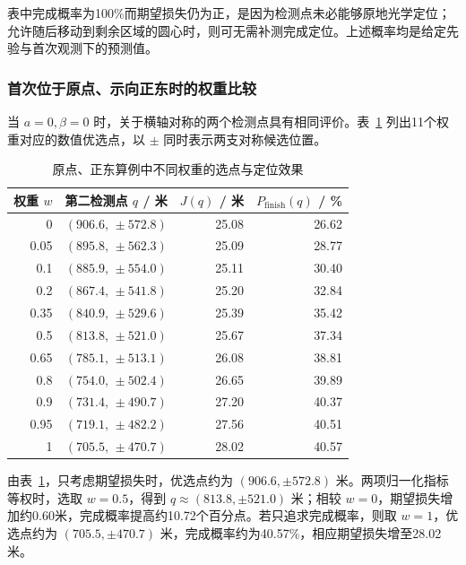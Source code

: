 \documentclass[UTF8,a4paper,zihao=-4,fontset=none]{ctexart}
\begin{document}
表中完成概率为100\%而期望损失仍为正，是因为检测点未必能够原地光学定位；允许随后移动到剩余区域的圆心时，则可无需补测完成定位。上述概率均是给定先验与首次观测下的预测值。

\subsubsection{首次位于原点、示向正东时的权重比较}

当 \(a=0,\beta=0\) 时，关于横轴对称的两个检测点具有相同评价。表~\ref{tab:q2-origin-weights} 列出11个权重对应的数值优选点，以 \(\pm\) 同时表示两支对称候选位置。

\begin{table}[htbp]
  \centering
  \caption{原点、正东算例中不同权重的选点与定位效果}
  \label{tab:q2-origin-weights}
  \small
  \renewcommand{\arraystretch}{1.08}
  \begin{tabular}{rrrr}
    \toprule
    权重 \(w\) & 第二检测点 \(q\) / 米 & \(J(q)\) / 米 & \(P_{\mathrm{finish}}(q)\) / \% \\
    \midrule
    0 & \((906.6,\,\pm572.8)\) & 25.08 & 26.62 \\
    0.05 & \((895.8,\,\pm562.3)\) & 25.09 & 28.77 \\
    0.1 & \((885.9,\,\pm554.0)\) & 25.11 & 30.40 \\
    0.2 & \((867.4,\,\pm541.8)\) & 25.20 & 32.84 \\
    0.35 & \((840.9,\,\pm529.6)\) & 25.39 & 35.42 \\
    0.5 & \((813.8,\,\pm521.0)\) & 25.67 & 37.34 \\
    0.65 & \((785.1,\,\pm513.1)\) & 26.08 & 38.81 \\
    0.8 & \((754.0,\,\pm502.4)\) & 26.65 & 39.89 \\
    0.9 & \((731.4,\,\pm490.7)\) & 27.20 & 40.37 \\
    0.95 & \((719.1,\,\pm482.2)\) & 27.56 & 40.51 \\
    1 & \((705.5,\,\pm470.7)\) & 28.02 & 40.57 \\
    \bottomrule
  \end{tabular}
\end{table}

由表~\ref{tab:q2-origin-weights}，只考虑期望损失时，优选点约为 \((906.6,\pm572.8)\) 米。两项归一化指标等权时，选取 \(w=0.5\)，得到 \(q\approx(813.8,\pm521.0)\) 米；相较 \(w=0\)，期望损失增加约0.60米，完成概率提高约10.72个百分点。若只追求完成概率，则取 \(w=1\)，优选点约为 \((705.5,\pm470.7)\) 米，完成概率约为40.57\%，相应期望损失增至28.02米。
\end{document}
